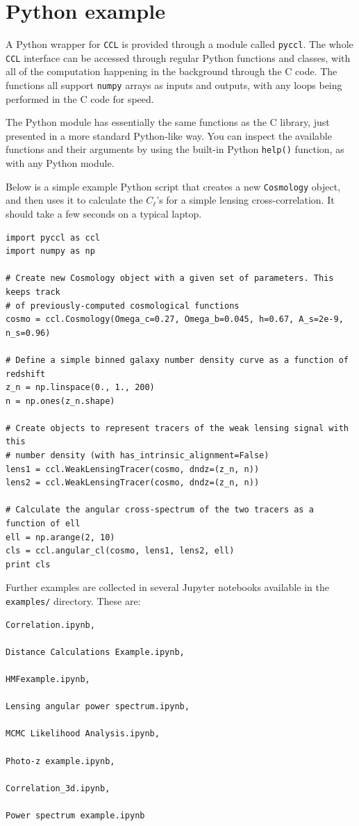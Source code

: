 \documentclass[\docopts]{\docclass}
\newcommand{\ccl}{{\tt CCL}\xspace}
\begin{document}
\section{Python example}
\label{sec:python:example}

A Python wrapper for \ccl is provided through a module called {\tt pyccl}. The whole \ccl interface can be accessed through regular Python functions and classes, with all of the computation happening in the background through the C code. The functions all support {\tt numpy} arrays as inputs and outputs, with any loops being performed in the C code for speed.

The Python module has essentially the same functions as the C library, just presented in a more standard Python-like way. You can inspect the available functions and their arguments by using the built-in Python {\tt help()} function, as with any Python module.

Below is a simple example Python script that creates a new {\tt Cosmology} object, and then uses it to calculate the $C_\ell$'s for a simple lensing cross-correlation. It should take a few seconds on a typical laptop.
\begin{verbatim}
import pyccl as ccl
import numpy as np

# Create new Cosmology object with a given set of parameters. This keeps track
# of previously-computed cosmological functions
cosmo = ccl.Cosmology(Omega_c=0.27, Omega_b=0.045, h=0.67, A_s=2e-9, n_s=0.96)

# Define a simple binned galaxy number density curve as a function of redshift
z_n = np.linspace(0., 1., 200)
n = np.ones(z_n.shape)

# Create objects to represent tracers of the weak lensing signal with this
# number density (with has_intrinsic_alignment=False)
lens1 = ccl.WeakLensingTracer(cosmo, dndz=(z_n, n))
lens2 = ccl.WeakLensingTracer(cosmo, dndz=(z_n, n))

# Calculate the angular cross-spectrum of the two tracers as a function of ell
ell = np.arange(2, 10)
cls = ccl.angular_cl(cosmo, lens1, lens2, ell)
print cls
\end{verbatim}

Further examples are collected in several Jupyter notebooks available in the {\tt examples/} directory. These are:
\begin{verbatim}
Correlation.ipynb,

Distance Calculations Example.ipynb,

HMFexample.ipynb,

Lensing angular power spectrum.ipynb,

MCMC Likelihood Analysis.ipynb,

Photo-z example.ipynb,

Correlation_3d.ipynb,

Power spectrum example.ipynb
\end{verbatim}
\end{document}
